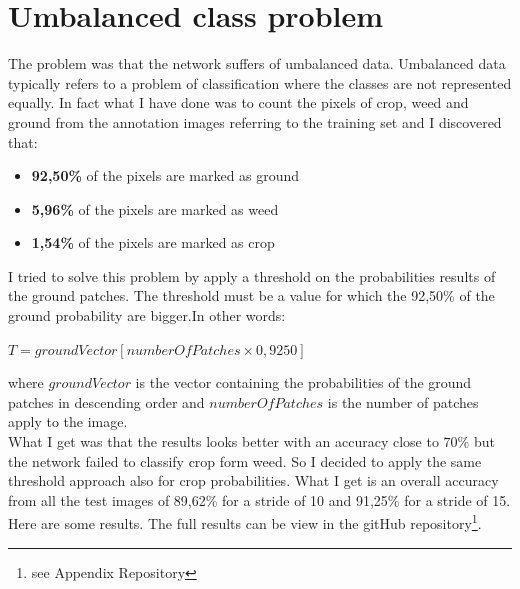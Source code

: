 \documentclass[]{report}
\begin{document}
\section{Umbalanced class problem}

The problem was that the network suffers of umbalanced data. Umbalanced data typically refers to a problem of classification where the classes are not represented equally. In fact what I have done was to count the pixels of crop, weed and ground from the annotation images referring to the training set and I discovered that:

\begin{itemize}

	\item \textbf{92,50\%} of the pixels are marked as ground
	\item \textbf{5,96\%} of the pixels are marked as weed
	\item \textbf{1,54\%} of the pixels are marked as crop

\end{itemize}

I tried to solve this problem by apply a threshold on the probabilities results of the ground patches. The threshold must be a value for which the 92,50\% of the ground probability are bigger.In other words:

\begin{center}
	$ T = groundVector[numberOfPatches\times 0,9250] $
\end{center}

where $groundVector $ is the vector containing the probabilities of the ground patches in descending order and $numberOfPatches $ is the number of patches apply to the image.\\
What I get was that the results looks better with an accuracy close to $ 70\% $ but the network failed to classify crop form weed. So I decided to apply the same threshold approach also for crop probabilities. What I get is an overall accuracy from all the test images of 89,62\% for a stride of 10 and 91,25\% for a stride of 15.\\
Here are some results. The full results can be view in the gitHub repository\footnote{see Appendix Repository}.
\end{document}
